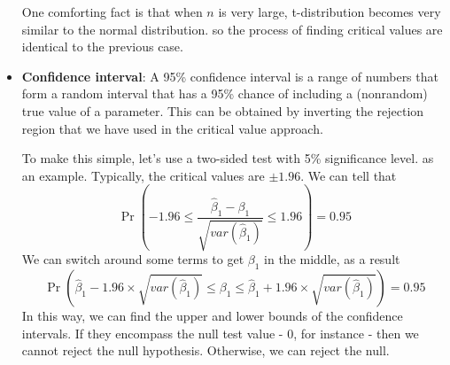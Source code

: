 \documentclass[12pt]{article}
\theoremstyle{definition}
\theoremstyle{property}
\theoremstyle{assumption}
\theoremstyle{example}
\theoremstyle{comment}
\begin{document}
\begin{itemize}
One comforting fact is that when $n$ is very large, t-distribution becomes very similar to the normal distribution. so the process of finding critical values are identical to the previous case.
\item \textbf{Confidence interval}: A 95\% confidence interval is a range of numbers that form a random interval that has a 95\% chance of including a (nonrandom) true value of a parameter. This can be obtained by inverting the rejection region that we have used in the critical value approach. \par\medskip
To make this simple, let's use a two-sided test  with 5\% significance level. as an example. Typically, the critical values are $\pm1.96$. We can tell that 
\[
\Pr\left(-1.96\leq \frac{\hat{\beta}_1-\beta_1}{\sqrt{var(\hat{\beta}_1)}} \leq1.96\right)=0.95
\]
We can switch around some terms to get $\beta_1$ in the middle, as a result
\[
\Pr\left(\hat{\beta}_1-1.96\times\sqrt{var(\hat{\beta}_1)} \leq \beta_1 \leq\hat{\beta}_1+1.96\times\sqrt{var(\hat{\beta}_1)}\right)=0.95
\]
In this way, we can find the upper and lower bounds of the confidence intervals. If they encompass the null test value - 0, for instance - then we cannot reject the null hypothesis. Otherwise, we can reject the null. 
\end{itemize}


\end{document}
